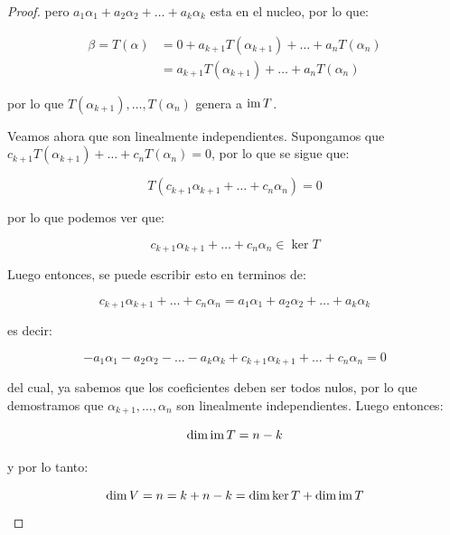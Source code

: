 \begin{proof}
			pero $a_1 \alpha_1 + a_2 \alpha_2 + \dots + a_k \alpha_k$ esta en el nucleo, por lo que:

			\begin{align*}
				\beta = T(\alpha) &= 0 + a_{k+1} T(\alpha_{k+1}) + \dots + a_n T(\alpha_n) \\
				&= a_{k+1} T(\alpha_{k+1}) + \dots + a_n T(\alpha_n)
			\end{align*}

			por lo que $T(\alpha_{k+1}), \dots, T(\alpha_n)$ genera a $\operatorname{im}{T}$.

			Veamos ahora que son linealmente independientes.
			Supongamos que $c_{k+1} T(\alpha_{k+1}) + \dots + c_n T(\alpha_n) = 0$, por lo que se sigue que:

			\begin{equation*}
				T(c_{k+1} \alpha_{k+1} + \dots + c_n \alpha_n) = 0
			\end{equation*}

			por lo que podemos ver que:

			\begin{equation*}
				c_{k+1} \alpha_{k+1} + \dots + c_n \alpha_n \in \ker{T}
			\end{equation*}

			Luego entonces, se puede escribir esto en terminos de:

			\begin{equation*}
				c_{k+1} \alpha_{k+1} + \dots + c_n \alpha_n = a_1 \alpha_1 + a_2 \alpha_2 + \dots + a_k \alpha_k
			\end{equation*}

			es decir:

			\begin{equation*}
				-a_1 \alpha_1 - a_2 \alpha_2 - \dots - a_k \alpha_k + c_{k+1} \alpha_{k+1} + \dots + c_n \alpha_n = 0
			\end{equation*}

			del cual, ya sabemos que los coeficientes deben ser todos nulos, por lo que demostramos que $\alpha_{k+1}, \dots, \alpha_n$ son linealmente independientes.
			Luego entonces:

			\begin{equation*}
				\dim{\operatorname{im}{T}} = n - k
			\end{equation*}

			y por lo tanto:

			\begin{equation*}
				\dim{V} = n = k + n - k = \dim{\ker{T}} + \dim{\operatorname{im}{T}}
			\end{equation*}
		\end{proof}
	\newpage
